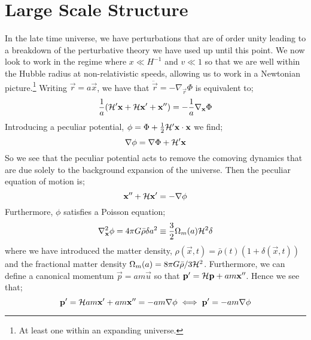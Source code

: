 \section{Large Scale Structure}
In the late time universe, we have perturbations that are of order unity leading to a breakdown of the perturbative theory we have used up until this point. We now look to work in the regime where $x \ll H^{-1}$ and $v \ll 1$ so that we are well within the Hubble radius at non-relativistic speeds, allowing us to work in a Newtonian picture.\footnote{At least one within an expanding universe.} Writing $\vec{r} = a\vec{x}$, we have that $\ddot{\vec{r}} = - \nabla_{\vec{r}}\Phi$ is equivalent to;
\begin{equation*}
\frac{1}{a}\left(\hamilt\pr \vec{x} + \hamilt \vec{x}\pr + \vec{x}^{\prime\prime}\right) = -\frac{1}{a}\nabla_{\vec{x}}\Phi
\end{equation*} 
Introducing a peculiar potential, $\phi = \Phi + \tfrac{1}{2}\mathcal{H}^{\prime} \mathbf{x}\cdot\mathbf{x}$ we find;
\begin{equation*}
\nabla \phi = \nabla \Phi + \mathcal{H}^{\prime} \mathbf{x}
\end{equation*}
So we see that the peculiar potential acts to remove the comoving dynamics that are due solely to the background expansion of the universe. Then the peculiar equation of motion is;
\begin{equation}
\mathbf{x}^{\prime\prime} + \mathcal{H} \mathbf{x}^{\prime} = -\nabla \phi
\end{equation}
Furthermore, $\phi$ satisfies a Poisson equation;
\begin{equation}
\nabla^2_{\mathbf{x}}\phi = 4\pi G \bar{\rho}\delta a^2 \equiv \frac{3}{2}\Omega_{m}(a)\mathcal{H}^2 \delta
\end{equation}
where we have introduced the matter density, $\rho(\vec{x}, t) = \bar{\rho}(t)\left(1 + \delta(\vec{x}, t)\right)$ and the fractional matter density $\Omega_m(a) = 8\pi G \bar{\rho}/3\mathcal{H}^2$. Furthermore, we can define a canonical momentum $\vec{p} = am \vec{u}$ so that $\mathbf{p}^{\prime} = \mathcal{H} \mathbf{p} + am \mathbf{x}^{\prime\prime}$. Hence we see that;
\begin{equation*}
\mathbf{p}^{\prime} = \mathcal{H} am \mathbf{x}^{\prime} + am \mathbf{x}^{\prime\prime} = -am \nabla \phi \iff \mathbf{p}^{\prime} = -am \nabla \phi
\end{equation*}
